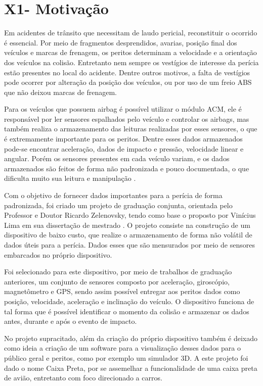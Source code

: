 \section{X1- Motivação}

Em acidentes de trânsito que necessitam de laudo pericial, reconstituir o ocorrido é essencial. Por meio de fragmentos desprendidos, avarias, posição final dos veículos e marcas de frenagem, os peritos determinam a velocidade e a orientação dos veículos na colisão. Entretanto nem sempre os vestígios de interesse da perícia estão presentes no local do acidente. Dentre outros motivos, a falta de vestígios pode ocorrer por alteração da posição dos veículos, ou por uso de um freio ABS que não deixou marcas de frenagem.

Para os veículos que possuem airbag é possível utilizar o módulo \acrfull{ACM}, ele é responsável por ler sensores espalhados pelo veículo e controlar os airbags, mas também realiza o armazenamento das leituras realizadas por esses sensores, o que é extremamente importante para os peritos. Dentre esses dados armazenados pode-se encontrar aceleração, dados de impacto e pressão, velocidade linear e angular. Porém os sensores presentes em cada veículo variam, e os dados armazenados são feitos de forma não padronizada e pouco documentada, o que dificulta muito sua leitura e manipulação \cite{lima_proposta_2016}.

Com o objetivo de fornecer dados importantes para a perícia de forma padronizada, foi criado um projeto de graduação conjunta, orientada pelo Professor e Doutor Ricardo Zelenovsky, tendo como base o proposto por Vinícius Lima em sua dissertação de mestrado \cite{lima_proposta_2016}. O projeto consiste na construção de um dispositivo de baixo custo, que realize o armazenamento de forma não volátil de dados úteis para a perícia. Dados esses que são mensurados por meio de sensores embarcados no próprio dispositivo.

Foi selecionado para este dispositivo, por meio de trabalhos de graduação anteriores, um conjunto de sensores composto por aceleração, giroscópio, magnetômetro e GPS, sendo assim possível entregar aos peritos dados como posição, velocidade, aceleração e inclinação do veículo. O dispositivo funciona de tal forma que é possível identificar o momento da colisão e armazenar os dados antes, durante e após o evento de impacto.

No projeto supracitado, além da criação do próprio dispositivo também é deixado como ideia a criação de um software para a visualização desses dados para o público geral e peritos, como por exemplo um simulador 3D. A este projeto foi dado o nome Caixa Preta, por se assemelhar a funcionalidade de uma caixa preta de avião, entretanto com foco direcionado a carros.

